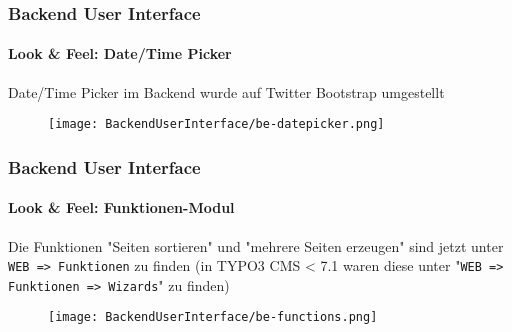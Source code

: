%

\begin{frame}[fragile]
	\frametitle{Backend User Interface}
	\framesubtitle{Look \& Feel: Date/Time Picker}

	Date/Time Picker im Backend wurde auf Twitter Bootstrap umgestellt
	\begin{figure}
		\texttt{[image: BackendUserInterface/be-datepicker.png]}
	\end{figure}

\end{frame}


\begin{frame}[fragile]
	\frametitle{Backend User Interface}
	\framesubtitle{Look \& Feel: Funktionen-Modul}

	Die Funktionen "Seiten sortieren" und "mehrere Seiten erzeugen" sind jetzt unter \texttt{WEB => Funktionen} zu finden\newline
	\smaller(in TYPO3 CMS < 7.1 waren diese unter "\texttt{WEB => Funktionen => Wizards}" zu finden)

	\begin{figure}
		\texttt{[image: BackendUserInterface/be-functions.png]}
	\end{figure}


\end{frame}

